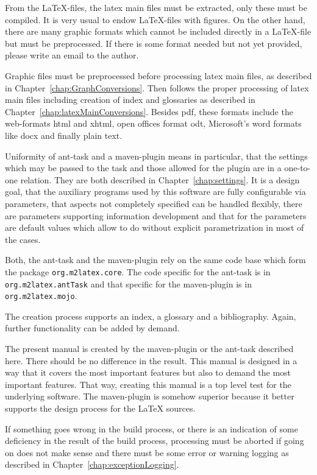 \documentclass[12pt]{book}
\newcommand{\gls}[1]{#1}
\renewcommand{\index}[1]{ }
\begin{document}
From the \LaTeX-files, the latex main files must be extracted, 
only these must be compiled. 
It is very usual to endow \LaTeX-files with figures. 
On the other hand, there are many graphic formats 
which cannot be included directly in a \LaTeX-file 
but must be preprocessed. 
If there is some format needed but not yet provided, 
please write an email to the author. 

Graphic files must be preprocessed before processing latex main files, 
as described in Chapter~\ref{chap:GraphConversions}. 
Then follows the proper processing of latex main files 
including creation of index and glossaries 
as described in Chapter~\ref{chap:latexMainConversions}. 
Besides \gls{pdf}, these formats include the web-formats \gls{html} 
and \gls{xhtml}, 
open offices format \gls{odt}, Microsoft's word formats like \gls{docx} 
and finally plain text. 

Uniformity of ant-task and a maven-plugin means in particular, 
that the settings which may be passed to the task 
and those allowed for the plugin are in a one-to-one relation. 
They are both described in Chapter~\ref{chap:settings}. 
It is a design goal, that the auxiliary programs 
used by this software are fully configurable via parameters, 
that aspects not completely specified can be handled flexibly, 
there are parameters supporting information development 
and that for the parameters are default values 
which allow to do without explicit parametrization in most of the cases. 
\index{ant-task}
Both, the ant-task and the maven-plugin rely on the same code base 
which form the package \texttt{org.m2latex.core}. 
The code specific for the ant-task is in \texttt{org.m2latex.antTask} 
and that specific for the maven-plugin is in \texttt{org.m2latex.mojo}. 


The creation process supports an index, a glossary and a bibliography. 
Again, further functionality can be added by demand. 

The present manual is created by the maven-plugin or the ant-task 
described here. 
There should be no difference in the result. 
This manual is designed in a way that it covers the most important features 
but also to demand the most important features. 
That way, creating this manual is a top level test 
for the underlying software. 
The maven-plugin is somehow superior 
because it better supports the design process for the \LaTeX{} sources. 

If something goes wrong in the build process, 
or there is an indication 
of some deficiency in the result of the build process, 
processing must be aborted if going on does not make sense 
and there must be some error or warning logging 
as described in Chapter~\ref{chap:exceptionLogging}. 
\end{document}
